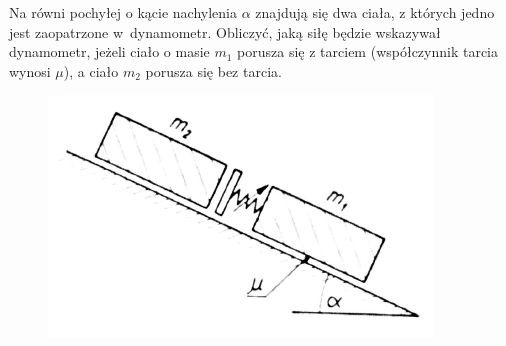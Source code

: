Na równi pochyłej o kącie nachylenia \emph{$\alpha$} znajdują się dwa ciała, z których jedno jest zaopatrzone w~dynamometr. Obliczyć, jaką siłę będzie wskazywał dynamometr, jeżeli ciało o masie \emph{$m_1$} porusza się z tarciem (współczynnik tarcia wynosi $\mu$), a ciało \emph{$m_2$} porusza się bez tarcia.
\begin{figure}[h]
	\centering
	\includegraphics[width=0.4\linewidth]{../rysunki/dynamika/dynamometr-dwa-klocki}
\end{figure}

